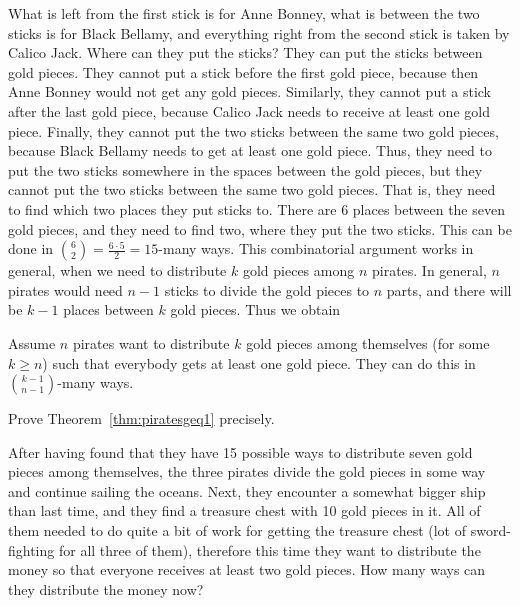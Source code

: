 What is left from the first stick is for Anne Bonney, 
what is between the two sticks is for Black Bellamy, 
and everything right from the second stick is taken by Calico Jack. 
Where can they put the sticks? 
They can put the sticks between gold pieces. 
They cannot put a stick before the first gold piece, 
because then Anne Bonney would not get any gold pieces. 
Similarly, they cannot put a stick after the last gold piece, 
because Calico Jack needs to receive at least one gold piece. 
Finally, they cannot put the two sticks between the same two gold pieces, 
because Black Bellamy needs to get at least one gold piece.
Thus, they need to put the two sticks somewhere in the spaces between the gold pieces, 
but they cannot put the two sticks between the same two gold pieces. 
That is, they need to find which two places they put sticks to. 
There are 6 places between the seven gold pieces, 
and they need to find two, where they put the two sticks. 
This can be done in $\binom{6}{2}=\frac{6\cdot 5}{2}=15$-many ways. 
This combinatorial argument works in general, 
when we need to distribute $k$ gold pieces among $n$ pirates. 
In general, $n$ pirates would need $n-1$ sticks to divide the gold pieces to $n$ parts, 
and there will be $k-1$ places between $k$ gold pieces. 
Thus we obtain 

\begin{theorem}\label{thm:piratesgeq1}
Assume $n$ pirates want to distribute $k$ gold pieces among themselves (for some $k\geq n$) such that everybody gets at least one gold piece. 
They can do this in $\binom{k-1}{n-1}$-many ways. 
\end{theorem}

\begin{exercise}\label{ex:piratesgeq1}
Prove Theorem~\ref{thm:piratesgeq1} precisely. 
\end{exercise}

After having found that they have 15 possible ways to distribute seven gold pieces among themselves, 
the three pirates divide the gold pieces in some way and continue sailing the oceans. 
Next, they encounter a somewhat bigger ship than last time, 
and they find a treasure chest with 10 gold pieces in it. 
All of them needed to do quite a bit of work for getting the treasure chest 
(lot of sword-fighting for all three of them), 
therefore this time they want to distribute the money so that everyone receives at least two gold pieces. 
How many ways can they distribute the money now? 


